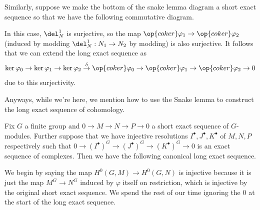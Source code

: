 Similarly, suppose we make the bottom of the snake lemma diagram a short exact sequence so that we have the following commutative diagram.
\begin{center}
\end{center}
In this case, $\del_N^1$ is surjective, so the map $\op{coker}\varphi_1\to\op{coker}\varphi_2$ (induced by modding $\del_N^1:N_1\to N_2$ by modding) is also surjective. It follows that we can extend the long exact sequence as
\[\ker\varphi_0\to\ker\varphi_1\to\ker\varphi_2\stackrel\delta\to\op{coker}\varphi_0\to\op{coker}\varphi_1\to\op{coker}\varphi_2\to0\]
due to this surjectivity.

Anyways, while we're here, we mention how to use the Snake lemma to construct the long exact sequence of cohomology.
\begin{theorem}
    Fix $G$ a finite group and $0\to M\to N\to P\to 0$ a short exact sequence of $G$-modules. Further suppose that we have injective resolutions $I^\bullet,J^\bullet,K^\bullet$ of $M,N,P$ respectively such that $0\to(I^\bullet)^G\to(J^\bullet)^G\to(K^\bullet)^G\to0$ is an exact sequence of complexes. Then we have the following canonical long exact sequence.
    \begin{center}
    \end{center}
\end{theorem}
We begin by saying the map $H^0(G,M)\to H^0(G,N)$ is injective because it is just the map $M^G\to N^G$ induced by $\varphi$ itself on restriction, which is injective by the original short exact sequence. We spend the rest of our time ignoring the $0$ at the start of the long exact sequence.

